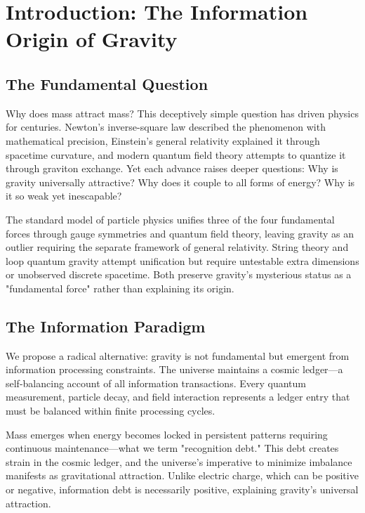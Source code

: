 \documentclass[12pt]{article}
\begin{document}
\section{Introduction: The Information Origin of Gravity}

\subsection{The Fundamental Question}

Why does mass attract mass? This deceptively simple question has driven physics for centuries. Newton's inverse-square law described the phenomenon with mathematical precision, Einstein's general relativity explained it through spacetime curvature, and modern quantum field theory attempts to quantize it through graviton exchange. Yet each advance raises deeper questions: Why is gravity universally attractive? Why does it couple to all forms of energy? Why is it so weak yet inescapable?

The standard model of particle physics unifies three of the four fundamental forces through gauge symmetries and quantum field theory, leaving gravity as an outlier requiring the separate framework of general relativity. String theory and loop quantum gravity attempt unification but require untestable extra dimensions or unobserved discrete spacetime. Both preserve gravity's mysterious status as a "fundamental force" rather than explaining its origin.

\subsection{The Information Paradigm}

We propose a radical alternative: gravity is not fundamental but emergent from information processing constraints. The universe maintains a cosmic ledger—a self-balancing account of all information transactions. Every quantum measurement, particle decay, and field interaction represents a ledger entry that must be balanced within finite processing cycles.

Mass emerges when energy becomes locked in persistent patterns requiring continuous maintenance—what we term "recognition debt." This debt creates strain in the cosmic ledger, and the universe's imperative to minimize imbalance manifests as gravitational attraction. Unlike electric charge, which can be positive or negative, information debt is necessarily positive, explaining gravity's universal attraction.
\end{document}
